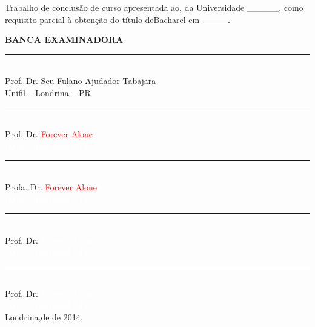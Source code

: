 \vspace{2.0cm}
\begin{singlespace}
\noindent
\begin{flushright}
\begin{minipage}[t]{7cm}

Trabalho de conclusão de curso apresentada ao, da Universidade \_\_\_\_\_, como requisito parcial à obtenção do título de\linebreak Bacharel em \_\_\_\_.

\end{minipage}
\end{flushright}
\vspace{0.8 cm}
\noindent

\begin{center}
  \parbox{11cm}
  {
  \begin{center}
  \textbf{BANCA EXAMINADORA} \\
  \vspace{1.5cm}
  \rule{9cm}{.1mm}\\
    Prof. Dr. Seu Fulano Ajudador Tabajara\\Unifil -- Londrina -- PR \\
    \vspace{6mm}
  \rule{9cm}{.1mm} \\
    Prof. Dr. \textcolor{red}{Forever Alone} \\\textcolor{white}{DMU -- Derpland -- IT} \\
    \vspace{6mm}
  \rule{9cm}{.1mm} \\
    Profa. Dr. \textcolor{red}{Forever Alone} \\\textcolor{white}{DMU -- Derpland -- IT} \\
  \vspace{4mm}
  \rule{9cm}{.1mm} \\
    Prof. Dr. \textcolor{white}{Forever Alone} \\\textcolor{white}{DMU -- Derpland -- IT} \\
    \vspace{6mm}
  \rule{9cm}{.1mm} \\
    Prof. Dr. \textcolor{white}{Forever Alone} \\\textcolor{white}{DMU -- Derpland -- IT} \\
  \vspace{1.7cm}
  Londrina,\underline{\hspace{1cm}}de \underline{\hspace{3cm}} de 2014.
  \end{center}
  }
\end{center}
\end{singlespace}

